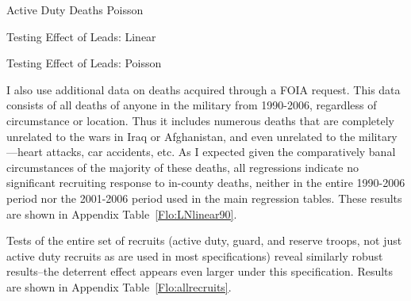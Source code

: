 \documentclass[12pt] {article}
\begin{document}
\begin{table}
\caption{Active Duty Deaths Poisson}
\label{Flo:RdeathsP} 
\scalebox{0.85}{}
\end{table}



\clearpage{}
\begin{table}
\caption{Testing Effect of Leads: Linear}
\label{Flo:forwardbasicLN}
\scalebox{0.8}{
}
\end{table}

\pagebreak{}
\clearpage{}
\begin{table}
\caption{Testing Effect of Leads: Poisson}
\label{Flo:forwardPbasic}
\scalebox{0.9}{
}
\end{table}


I also use additional data on deaths acquired through a FOIA request. This data consists of all deaths of anyone in the military from 1990-2006, regardless of circumstance or location. Thus it includes numerous deaths that are completely unrelated to the wars in Iraq or Afghanistan, and even unrelated to the military---heart attacks, car accidents, etc. As I expected given the comparatively banal circumstances of the majority of these deaths, all regressions indicate no significant recruiting response to in-county deaths, neither in the entire 1990-2006 period nor the 2001-2006 period used in the main regression tables. These results are shown in Appendix Table~\ref{Flo:LNlinear90}.%

\begin{table}
\caption{}
\label{Flo:LNlinear90}
\scalebox{0.8}{
}
\end{table}


Tests of the entire set of recruits (active duty, guard, and reserve troops, not just active duty recruits as are used in most specifications) reveal similarly robust results--the deterrent effect appears even larger under this specification. Results are shown in Appendix Table~\ref{Flo:allrecruits}.
\end{document}
